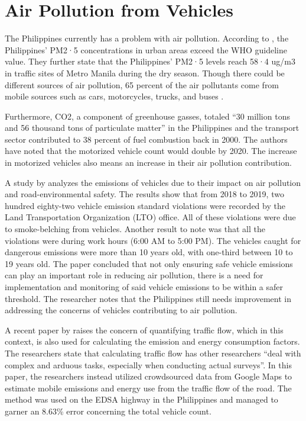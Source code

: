 \section{Air Pollution from Vehicles}
The Philippines currently has a problem with air pollution. According to \cite{TANTENGCO2022}, the Philippines’ PM2·5 concentrations in urban areas exceed the WHO guideline value. They further state that the Philippines’ PM2·5 levels reach 58·4 ug/m3 in traffic sites of Metro Manila during the dry season. Though there could be different sources of air pollution, 65 percent of the air pollutants come from mobile sources such as cars, motorcycles, trucks, and buses \cite{EMB_2015}.

	Furthermore, CO2, a component of greenhouse gasses, totaled “30 million tons and 56 thousand tons of particulate matter” \cite{FabianGota2009} in the Philippines and the transport sector contributed to 38 percent of fuel combustion back in 2000. The authors have noted that the motorized vehicle count would double by 2020. The increase in motorized vehicles also means an increase in their air pollution contribution. 

A study by \cite{lu_2022} analyzes the emissions of vehicles due to their impact on air pollution and road-environmental safety. The results show that from 2018 to 2019, two hundred eighty-two vehicle emission standard violations were recorded by the Land Transportation Organization (LTO) office. All of these violations were due to smoke-belching from vehicles. Another result to note was that all the violations were during work hours (6:00 AM to 5:00 PM). The vehicles caught for dangerous emissions were more than 10 years old, with one-third between 10 to 19 years old. The paper concluded that not only ensuring safe vehicle emissions can play an important role in reducing air pollution, there is a need for implementation and monitoring of said vehicle emissions to be within a safer threshold. The researcher notes that the Philippines still needs improvement in addressing the concerns of vehicles contributing to air pollution.

A recent paper by  raises the concern of quantifying traffic flow, which in this context, is also used for calculating the emission and energy consumption factors. The researchers state that calculating traffic flow has other researchers “deal with complex and arduous tasks, especially when conducting actual surveys”. In this paper, the researchers instead utilized crowdsourced data from Google Maps to estimate mobile emissions and energy use from the traffic flow of the road. The method was used on the EDSA highway in the Philippines and managed to garner an 8.63\% error concerning the total vehicle count.

